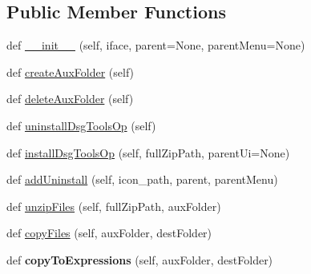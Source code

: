 \subsection*{Public Member Functions}
\begin{DoxyCompactItemize}
\item 
def \mbox{\hyperlink{class_dsg_tools_1_1_dsg_tools_op_1_1dsg_tools_op_installer_1_1_dsg_tools_op_installer_ad58477e8e3df7a45df2c0cbae03c0590}{\+\_\+\+\_\+init\+\_\+\+\_\+}} (self, iface, parent=None, parent\+Menu=None)
\item 
def \mbox{\hyperlink{class_dsg_tools_1_1_dsg_tools_op_1_1dsg_tools_op_installer_1_1_dsg_tools_op_installer_a71b1b13badaea73c9c90f631fad8ba36}{create\+Aux\+Folder}} (self)
\item 
def \mbox{\hyperlink{class_dsg_tools_1_1_dsg_tools_op_1_1dsg_tools_op_installer_1_1_dsg_tools_op_installer_a5befb368651c765f8e147325cfcb8b04}{delete\+Aux\+Folder}} (self)
\item 
def \mbox{\hyperlink{class_dsg_tools_1_1_dsg_tools_op_1_1dsg_tools_op_installer_1_1_dsg_tools_op_installer_a4182f7f63775d033eecb6f428fefaf38}{uninstall\+Dsg\+Tools\+Op}} (self)
\item 
def \mbox{\hyperlink{class_dsg_tools_1_1_dsg_tools_op_1_1dsg_tools_op_installer_1_1_dsg_tools_op_installer_a8895201444e39cf4eb5634f28fa16a85}{install\+Dsg\+Tools\+Op}} (self, full\+Zip\+Path, parent\+Ui=None)
\item 
def \mbox{\hyperlink{class_dsg_tools_1_1_dsg_tools_op_1_1dsg_tools_op_installer_1_1_dsg_tools_op_installer_a897f1ecb8ca6dba671824ad1f0239a9a}{add\+Uninstall}} (self, icon\+\_\+path, parent, parent\+Menu)
\item 
def \mbox{\hyperlink{class_dsg_tools_1_1_dsg_tools_op_1_1dsg_tools_op_installer_1_1_dsg_tools_op_installer_a8650989789a77d928a1fee122e82d45c}{unzip\+Files}} (self, full\+Zip\+Path, aux\+Folder)
\item 
def \mbox{\hyperlink{class_dsg_tools_1_1_dsg_tools_op_1_1dsg_tools_op_installer_1_1_dsg_tools_op_installer_a4f12609f9da8378c78343ec74dfdb682}{copy\+Files}} (self, aux\+Folder, dest\+Folder)
\item 
\mbox{\label{class_dsg_tools_1_1_dsg_tools_op_1_1dsg_tools_op_installer_1_1_dsg_tools_op_installer_a755ef36cf6a25701981b729feb52aee0}} 
def {\bfseries copy\+To\+Expressions} (self, aux\+Folder, dest\+Folder)
\item 

\end{DoxyCompactItemize}
